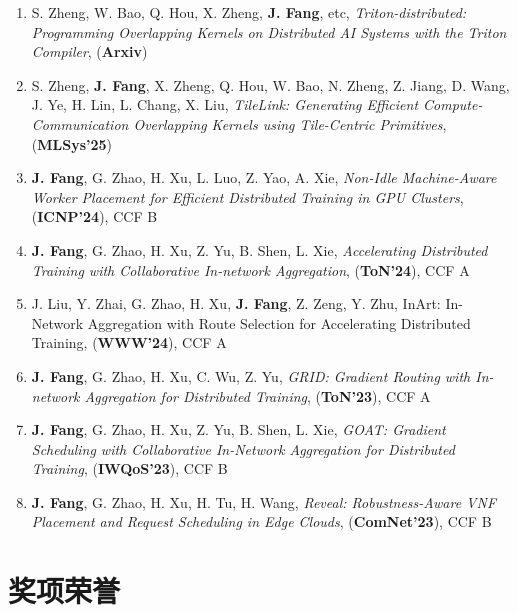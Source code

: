 \documentclass{resume}
\begin{document}
\begin{enumerate}[parsep=0.5ex]
  \item S. Zheng, W. Bao, Q. Hou, X. Zheng, \textbf{J. Fang}, etc, \textit{Triton-distributed: Programming Overlapping Kernels on Distributed AI Systems with the Triton Compiler},  (\textbf{Arxiv})
  \item S. Zheng, \textbf{J. Fang}, X. Zheng, Q. Hou, W. Bao, N. Zheng, Z. Jiang, D. Wang, J. Ye, H. Lin, L. Chang, X. Liu, \textit{TileLink: Generating Efficient Compute-Communication Overlapping Kernels using Tile-Centric Primitives}, (\textbf{MLSys'25})
  \item \textbf{J. Fang}, G. Zhao, H. Xu, L. Luo, Z. Yao, A. Xie, \textit{Non-Idle Machine-Aware Worker Placement for Efficient Distributed Training in GPU Clusters}, (\textbf{ICNP'24}), CCF B
  \item \textbf{J. Fang}, G. Zhao, H. Xu, Z. Yu, B. Shen, L. Xie, \textit{Accelerating Distributed Training with Collaborative In-network Aggregation}, (\textbf{ToN'24}), CCF A
  \item J. Liu, Y. Zhai, G. Zhao, H. Xu, \textbf{J. Fang}, Z. Zeng, Y. Zhu, InArt: In-Network Aggregation with Route Selection for Accelerating Distributed Training, (\textbf{WWW'24}), CCF A
  \item \textbf{J. Fang}, G. Zhao, H. Xu, C. Wu, Z. Yu, \textit{GRID: Gradient Routing with In-network Aggregation for Distributed Training}, (\textbf{ToN'23}), CCF A
  \item \textbf{J. Fang}, G. Zhao, H. Xu, Z. Yu, B. Shen, L. Xie, \textit{GOAT: Gradient Scheduling with Collaborative In-Network Aggregation for Distributed Training}, (\textbf{IWQoS'23}), CCF B
  \item \textbf{J. Fang}, G. Zhao, H. Xu, H. Tu, H. Wang, \textit{Reveal: Robustness-Aware VNF Placement and Request Scheduling in Edge Clouds}, (\textbf{ComNet'23}), CCF B
 
\end{enumerate}

\section{奖项荣誉}
\end{document}
